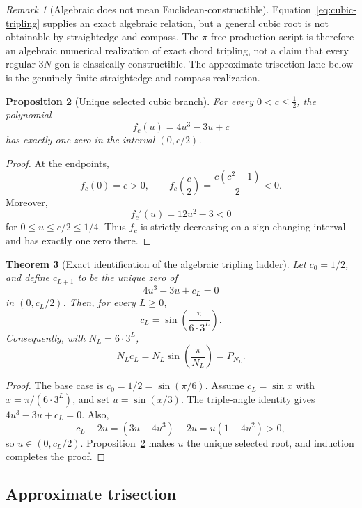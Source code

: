 \documentclass[12pt]{article}
\newtheorem{theorem}{Theorem}[section]
\newtheorem{proposition}[theorem]{Proposition}
\theoremstyle{definition}
\theoremstyle{remark}
\newtheorem{remark}[theorem]{Remark}
\begin{document}
\begin{remark}[Algebraic does not mean Euclidean-constructible]
Equation~\eqref{eq:cubic-tripling} supplies an exact algebraic relation, but a
general cubic root is not obtainable by straightedge and compass.  The
$\pi$-free production script is therefore an algebraic numerical realization
of exact chord tripling, not a claim that every regular $3N$-gon is classically
constructible.  The approximate-trisection lane below is the genuinely finite
straightedge-and-compass realization.
\end{remark}

\begin{proposition}[Unique selected cubic branch]
\label{prop:unique-cubic-branch}
For every $0<c\le\tfrac12$, the polynomial
\[
  f_c(u)=4u^3-3u+c
\]
has exactly one zero in the interval $(0,c/2)$.
\end{proposition}

\begin{proof}
At the endpoints,
\[
  f_c(0)=c>0,
  \qquad
  f_c\!\left(\frac c2\right)=\frac{c(c^2-1)}2<0.
\]
Moreover,
\[
  f_c'(u)=12u^2-3<0
\]
for $0\le u\le c/2\le1/4$.  Thus $f_c$ is strictly decreasing on a
sign-changing interval and has exactly one zero there.
\end{proof}

\begin{theorem}[Exact identification of the algebraic tripling ladder]
\label{thm:triple-angle-identification}
Let $c_0=1/2$, and define $c_{L+1}$ to be the unique zero of
\[
  4u^3-3u+c_L=0
\]
in $(0,c_L/2)$.  Then, for every $L\ge0$,
\[
  c_L=\sin\!\left(\frac{\pi}{6\cdot3^L}\right).
\]
Consequently, with $N_L=6\cdot3^L$,
\[
  N_Lc_L=N_L\sin\!\left(\frac{\pi}{N_L}\right)=P_{N_L}.
\]
\end{theorem}

\begin{proof}
The base case is $c_0=1/2=\sin(\pi/6)$.  Assume
$c_L=\sin x$ with $x=\pi/(6\cdot3^L)$, and set $u=\sin(x/3)$.  The triple-angle
identity gives $4u^3-3u+c_L=0$.  Also,
\[
  c_L-2u=(3u-4u^3)-2u=u(1-4u^2)>0,
\]
so $u\in(0,c_L/2)$.  Proposition~\ref{prop:unique-cubic-branch} makes $u$ the
unique selected root, and induction completes the proof.
\end{proof}

\subsection{Approximate trisection}
\label{subsec:approx-trisection}
\end{document}
